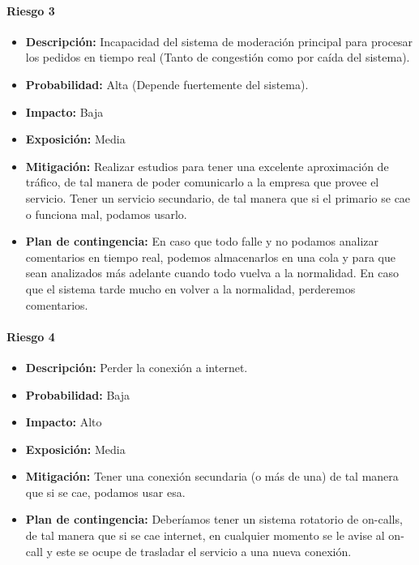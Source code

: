 \paragraph{Riesgo 3}
\begin{itemize}
  \item \textbf{Descripción:} Incapacidad del sistema de moderación principal para procesar los pedidos en tiempo real (Tanto de congestión como por caída del sistema).
  \item \textbf{Probabilidad:} Alta (Depende fuertemente del sistema).
  \item \textbf{Impacto:} Baja
  \item \textbf{Exposición:} Media
  \item \textbf{Mitigación:} Realizar estudios para tener una excelente aproximación de tráfico, de tal manera de poder comunicarlo a la empresa que provee el servicio. Tener un servicio secundario, de tal manera que si el primario se cae o funciona mal, podamos usarlo.
  \item \textbf{Plan de contingencia:} En caso que todo falle y no podamos analizar comentarios en tiempo real, podemos almacenarlos en una cola y para que sean analizados más adelante cuando todo vuelva a la normalidad. En caso que el sistema tarde mucho en volver a la normalidad, perderemos comentarios.
\end{itemize}

\paragraph{Riesgo 4}
\begin{itemize}
  \item \textbf{Descripción:} Perder la conexión a internet.
  \item \textbf{Probabilidad:} Baja
  \item \textbf{Impacto:} Alto
  \item \textbf{Exposición:} Media
  \item \textbf{Mitigación:} Tener una conexión secundaria (o más de una) de tal manera que si se cae, podamos usar esa.
  \item \textbf{Plan de contingencia:} Deberíamos tener un sistema rotatorio de on-calls, de tal manera que si se cae internet, en cualquier momento se le avise al on-call y este se ocupe de trasladar el servicio a una nueva conexión.
\end{itemize}

